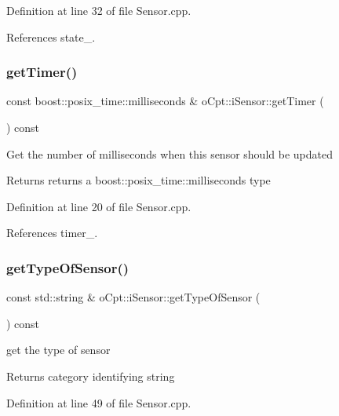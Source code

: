 Definition at line 32 of file Sensor.\+cpp.



References state\+\_\+.

\hypertarget{classo_cpt_1_1i_sensor_ad1651243755d72d5fd69668444555c77}{}\label{classo_cpt_1_1i_sensor_ad1651243755d72d5fd69668444555c77} 
\subsubsection{\texorpdfstring{get\+Timer()}{getTimer()}}
{\footnotesize\ttfamily const boost\+::posix\+\_\+time\+::milliseconds \& o\+Cpt\+::i\+Sensor\+::get\+Timer (\begin{DoxyParamCaption}{ }\end{DoxyParamCaption}) const}

Get the number of milliseconds when this sensor should be updated \begin{DoxyReturn}{Returns}
returns a boost\+::posix\+\_\+time\+::milliseconds type 
\end{DoxyReturn}


Definition at line 20 of file Sensor.\+cpp.



References timer\+\_\+.

\hypertarget{classo_cpt_1_1i_sensor_aa356e53521301d555a7cbcee84bf54ea}{}\label{classo_cpt_1_1i_sensor_aa356e53521301d555a7cbcee84bf54ea} 
\subsubsection{\texorpdfstring{get\+Type\+Of\+Sensor()}{getTypeOfSensor()}}
{\footnotesize\ttfamily const std\+::string \& o\+Cpt\+::i\+Sensor\+::get\+Type\+Of\+Sensor (\begin{DoxyParamCaption}{ }\end{DoxyParamCaption}) const}

get the type of sensor \begin{DoxyReturn}{Returns}
category identifying string 
\end{DoxyReturn}


Definition at line 49 of file Sensor.\+cpp.




